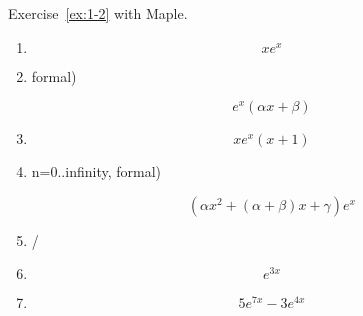 \begin{exercise}
    Exercise~\ref{ex:1-2} with Maple.
\end{exercise}
\begin{solution}
    \begin{enumerate}[label=(\alph*)]
        \item \begin{mapleinput}
\end{mapleinput} \begin{mapleoutput}
               \[x e^{x}\]
               \end{mapleoutput}   
        \item \begin{mapleinput}
  formal) 
\end{mapleinput} \begin{mapleoutput}
            \[e^x(\alpha x+\beta)\] \end{mapleoutput}
        \item \begin{mapleinput}
\end{mapleinput} \begin{mapleoutput}
    \[xe^x(x+1)\]
\end{mapleoutput}
        \item \begin{mapleinput}
  n=0..infinity, formal)
\end{mapleinput} \begin{mapleoutput}
            \[\left(\alpha  x^{2}+\left(\alpha +\beta \right) x+\gamma \right) e^{x} \]
        \end{mapleoutput}
    \item /
    \item \begin{mapleinput}
\end{mapleinput} \begin{mapleoutput}
        \[e^{3x}\]
    \end{mapleoutput}
    \item \begin{mapleinput}
\end{mapleinput} \begin{mapleoutput}
    \[5e^{7x}-3e^{4x}\]
\end{mapleoutput}
    \end{enumerate}
\end{solution}

